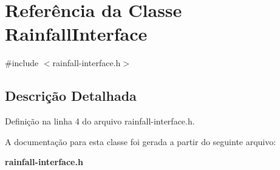 \section{Referência da Classe Rainfall\+Interface}
\label{class_rainfall_interface}


{\ttfamily \#include $<$rainfall-\/interface.\+h$>$}



\subsection{Descrição Detalhada}


Definição na linha 4 do arquivo rainfall-\/interface.\+h.



A documentação para esta classe foi gerada a partir do seguinte arquivo\+:\begin{DoxyCompactItemize}
\item 
{\bf rainfall-\/interface.\+h}\end{DoxyCompactItemize}
